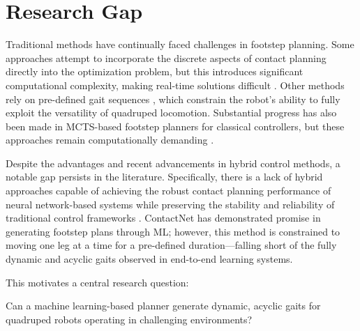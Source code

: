 \section{Research Gap}
\label{sec:introduction-research-gap}

Traditional methods have continually faced challenges in footstep
planning. Some approaches attempt to incorporate the discrete aspects
of contact planning directly into the optimization problem, but this
introduces significant computational complexity, making real-time
solutions difficult \cite{winkler_gait_2018}. Other methods rely on
pre-defined gait  sequences
\cite{xie_glide_2023, grandia_perceptive_2022, lee_learning_2020,
villarreal_fast_2019}, which constrain the robot's ability to fully
exploit the versatility of quadruped locomotion. Substantial progress
has also been made in MCTS-based footstep planners for classical
controllers, but these approaches remain computationally demanding
\cite{amatucci_monte_2022, taouil_non-gaited_2025}.

Despite the advantages and recent advancements in hybrid control
methods, a notable gap persists in the literature. Specifically,
there is a lack of hybrid approaches capable of achieving the robust
contact planning performance of neural network-based systems while
preserving the stability and reliability of traditional control
frameworks \cite{Meng2023Mar, Wensing2022Nov}. ContactNet
\cite{bratta_contactnet_2024} has demonstrated promise in generating
footstep plans through ML; however, this method is constrained to
moving one leg at a time for a pre-defined duration—falling short of
the fully dynamic and acyclic gaits observed in end-to-end learning systems.

This motivates a central research question:

\begin{emphasis}
  Can a machine learning-based planner generate dynamic, acyclic
  gaits for quadruped robots operating in challenging environments?
\end{emphasis}
